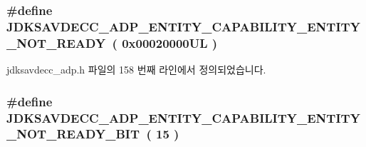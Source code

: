 \subsubsection[{\texorpdfstring{J\+D\+K\+S\+A\+V\+D\+E\+C\+C\+\_\+\+A\+D\+P\+\_\+\+E\+N\+T\+I\+T\+Y\+\_\+\+C\+A\+P\+A\+B\+I\+L\+I\+T\+Y\+\_\+\+E\+N\+T\+I\+T\+Y\+\_\+\+N\+O\+T\+\_\+\+R\+E\+A\+DY}{JDKSAVDECC_ADP_ENTITY_CAPABILITY_ENTITY_NOT_READY}}]{\setlength{\rightskip}{0pt plus 5cm}\#define J\+D\+K\+S\+A\+V\+D\+E\+C\+C\+\_\+\+A\+D\+P\+\_\+\+E\+N\+T\+I\+T\+Y\+\_\+\+C\+A\+P\+A\+B\+I\+L\+I\+T\+Y\+\_\+\+E\+N\+T\+I\+T\+Y\+\_\+\+N\+O\+T\+\_\+\+R\+E\+A\+DY~( 0x00020000\+U\+L )}\hypertarget{group__adp__entity__capability_gab7bee74d62b6e68f35f85b6889a61b84}{}\label{group__adp__entity__capability_gab7bee74d62b6e68f35f85b6889a61b84}


jdksavdecc\+\_\+adp.\+h 파일의 158 번째 라인에서 정의되었습니다.

\subsubsection[{\texorpdfstring{J\+D\+K\+S\+A\+V\+D\+E\+C\+C\+\_\+\+A\+D\+P\+\_\+\+E\+N\+T\+I\+T\+Y\+\_\+\+C\+A\+P\+A\+B\+I\+L\+I\+T\+Y\+\_\+\+E\+N\+T\+I\+T\+Y\+\_\+\+N\+O\+T\+\_\+\+R\+E\+A\+D\+Y\+\_\+\+B\+IT}{JDKSAVDECC_ADP_ENTITY_CAPABILITY_ENTITY_NOT_READY_BIT}}]{\setlength{\rightskip}{0pt plus 5cm}\#define J\+D\+K\+S\+A\+V\+D\+E\+C\+C\+\_\+\+A\+D\+P\+\_\+\+E\+N\+T\+I\+T\+Y\+\_\+\+C\+A\+P\+A\+B\+I\+L\+I\+T\+Y\+\_\+\+E\+N\+T\+I\+T\+Y\+\_\+\+N\+O\+T\+\_\+\+R\+E\+A\+D\+Y\+\_\+\+B\+IT~( 15 )}\hypertarget{group__adp__entity__capability_ga8efa9080c2bc91a3dbe5ac384f3e3f8f}{}\label{group__adp__entity__capability_ga8efa9080c2bc91a3dbe5ac384f3e3f8f}


